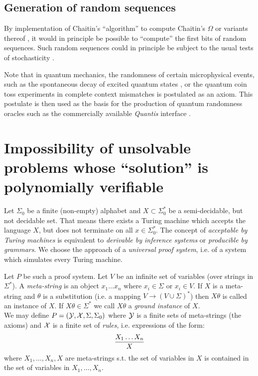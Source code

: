 \documentclass[12pt]{article}
\begin{document}
\subsection{Generation of random sequences}
By implementation of Chaitin's ``algorithm'' to compute
Chaitin's $\Omega$  \cite{chaitin:01}
or variants thereof \cite{calude:94},
it would in principle be possible to ``compute'' the first bits of random sequences.
Such random sequences could in principle be subject to the usual
tests of stochasticity \cite{svozil-qct,calude-dinneen05}.

Note that in quantum mechanics, the randomness of certain microphysical events,
such as the spontaneous decay of excited quantum states
\cite{erber-95,berkeland:052103},
or the quantum coin toss experiments in complete context mismatches
\cite{svozil-qct} is postulated as an axiom.
This postulate is then used as the basis for the production of quantum randomness oracles
such as the commercially available {\it Quantis}\textsuperscript{\texttrademark} interface \cite{Quantis}.


\section{Impossibility of unsolvable problems whose ``solution'' is polynomially verifiable}
%
Let $\Sigma_0$ be a finite (non-empty) alphabet and $X \subset \Sigma_0^*$
be a semi-decidable, but not decidable set. That means there exists a
Turing machine which accepts
the language $X$, but does not terminate on all $x \in \Sigma_0^*$.
The concept
of {\em acceptable by Turing machines} is equivalent to {\em derivable by
inference systems} or {\em producible by grammars}. We choose the approach of
a {\em universal proof system}, i.e. of a system which simulates every
Turing machine.

Let $P$ be such a proof system. Let $V$ be an infinite set of variables
(over strings in $\Sigma^*$). A {\em meta-string} is an object
$x_1 \ldots x_n$ where
$x_i \in \Sigma$ or $x_i \in V$. If $X$ is a meta-string and $\theta$ is a
substitution (i.e. a mapping $V \to (V \cup \Sigma)^*$)
then $X\theta$ is called an
instance of $X$. If $X\theta \in \Sigma^*$ we call $X\theta$ a {\em ground
instance} of $X$.\\[1ex]
%
We may define $P = ({\cal Y},{\cal X},\Sigma,\Sigma_0)$ where
${\cal Y}$ is a finite sets of meta-strings (the axioms) and
${\cal X}$ is a finite set of
{\em rules}, i.e. expressions of the form:
\[
{X_1 \ldots X_n\over X}
\]
%
where $X_1,\ldots,X_n,X$ are meta-strings s.t. the set of variables in $X$ is
contained in the set of variables in $X_1,\ldots,X_n$.
\end{document}
